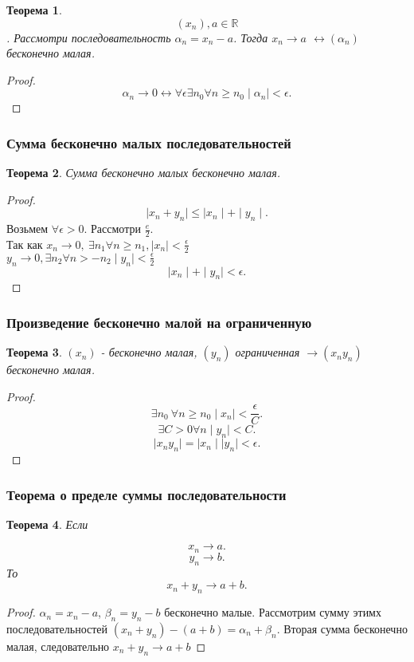 \documentclass[a4paper]{scrartcl}
\newtheorem{theorem}{Теорема}
\begin{document}
\subsubsection{}
\begin{theorem}
	$$(x_n) , a \in \mathbb{R}$$. Рассмотри последовательность $\alpha_n = x_n - a$. Тогда $x_n \to a$
	$\leftrightarrow (\alpha_n)$ бесконечно малая.
\end{theorem}
\begin{proof}
	\[
		\alpha_n \to 0 \leftrightarrow \forall  \epsilon \exists  n_0 \forall n \ge  n_0 \mid \alpha_n \mid <\epsilon
		.\]
\end{proof}
\subsubsection{Сумма бесконечно малых последовательностей}
\begin{theorem}
	Сумма бесконечно малых бесконечно малая.
\end{theorem}
\begin{proof}
	\[
		\mid x_n + y_n \mid \le \mid x_n \mid + \mid y_n \mid
		.\]
	Возьмем $\forall \epsilon > 0$. Рассмотри $\frac{e}{2}$.\\ Так как $x_n \to 0, ~ \exists n_1 \forall n
		\ge n_1 , \mid x_n \mid < \frac{\epsilon}{2}~$ \\
	$y_n \to 0 , \exists  n_2 \forall  n >- n_2 \mid y_n \mid < \frac{\epsilon}{2}$
	\[
		\mid x_n \mid + \mid y_n \mid < \epsilon
		.\]
\end{proof}
\subsubsection{Произведение бесконечно малой на ограниченную}
\begin{theorem}
	$(x_n)$ - бесконечно малая, $(y_n)$ ограниченная   $\rightarrow (x_{n}y_{n})$ бесконечно малая.
\end{theorem}
\begin{proof}
	\[
		\exists n_0 ~ \forall n \ge n_0 \mid x_n \mid < \frac{\epsilon}{C}
		.\]
	\[
		\exists C > 0 \forall n \mid y_n \mid < C
		.\]
	\[
		\mid x_n y_n \mid = \mid x_n \mid \mid y_n \mid < \epsilon
		.\]
\end{proof}
\subsubsection{Теорема о пределе суммы последовательности}
\begin{theorem}
	Если

	\[
		x_n \to a
		.\]
	\[
		y_n \to b
		.\]
	То
	\[
		x_n + y_n \to a + b
		.\]
\end{theorem}
\begin{proof}
	$\alpha_n = x_n - a$,  $\beta_n = y_n - b$ бесконечно малые.
	Рассмотрим  сумму этимх последовательностей $(x_n + y_n) - (a + b) = \alpha_n + \beta_n$. Вторая сумма бесконечно малая, следовательно  $x_n + y_n \to a + b$
\end{proof}
\end{document}
